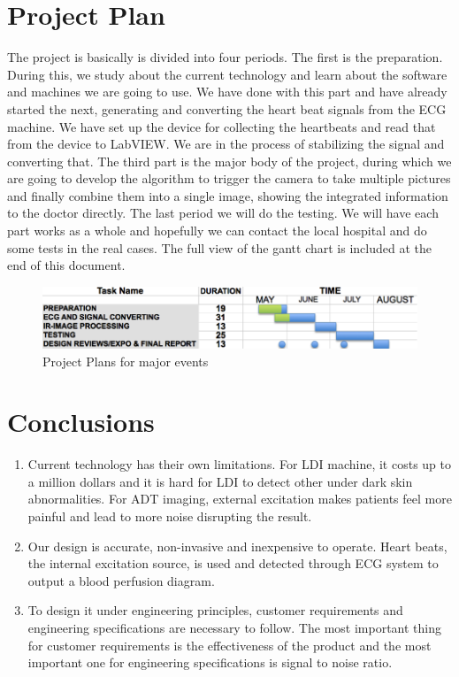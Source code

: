 \documentclass[paper=letter, fontsize=11pt]{scrartcl}
\numberwithin{equation}{section}		%
\numberwithin{figure}{section}			%
\numberwithin{table}{section}			%
\begin{document}
\section{Project Plan}
The project is basically is divided into four periods. The first is the preparation. During this, we study about the current technology and learn about the software and machines we are going to use.  We have done with this part and have already started the next, generating and converting the heart beat signals from the ECG machine. We have set up the device for collecting the heartbeats and read that from the device to LabVIEW. We are in the process of stabilizing the signal and converting that. The third part is the major body of the project, during which we are going to develop the algorithm to trigger the camera to take multiple pictures and finally combine them into a single image, showing the integrated information to the doctor directly.  The last period we will do the testing. We will have each part works as a whole and hopefully we can contact the local hospital and do some tests in the real cases.
The full view of the gantt chart is included at the end of this document.
\begin{figure}[H]
	\centering
	\includegraphics[scale=1]{pjp}
	\caption{Project Plans for major events}
\end{figure}

\section{Conclusions}
\begin{enumerate}
\item Current technology has their own limitations. For LDI machine, it costs up to a million dollars and it is 
hard for LDI to detect other under dark skin abnormalities. For ADT imaging, external excitation makes patients
feel more painful and lead to more noise disrupting the result. \\
\item Our design is accurate, non-invasive and inexpensive to operate. Heart beats, the internal excitation source,
is used and detected through ECG system to output a blood perfusion diagram. \\
\item To design it under engineering principles, customer requirements and engineering specifications are necessary
to follow. The most important thing for customer requirements is the effectiveness of the product and the most 
important one for engineering specifications is signal to noise ratio.
\end{enumerate}
\end{document}

